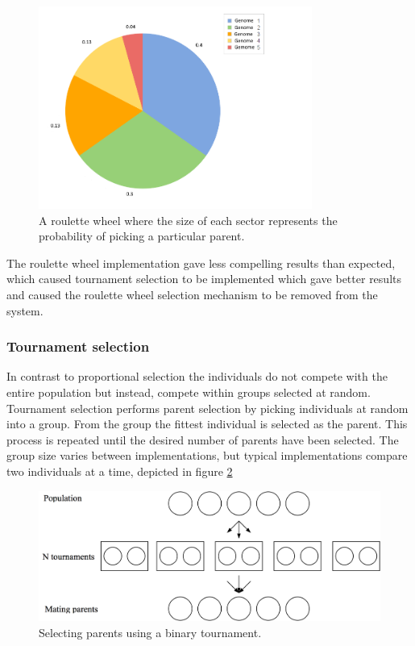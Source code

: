 \begin{figure}[H]
	\centering
	\includegraphics[width=0.80\textwidth, clip]{chapters/res/roulette.png}
	\caption{A roulette wheel where the size of each sector represents the probability of picking a particular parent.}
	\label{fig:roulette}
\end{figure}

The roulette wheel implementation gave less compelling results than expected, which caused tournament selection to be implemented which gave better results and caused the roulette wheel selection mechanism to be removed from the system.		
\subsubsection{Tournament selection}
In contrast to proportional selection the individuals do not compete with the entire population but instead, compete within groups selected at random.
Tournament selection performs parent selection by picking individuals at random into a group.
From the group the fittest individual is selected as the parent.
This process is repeated until the desired number of parents have been selected.
The group size varies between implementations, but typical implementations compare two\cite{goh_sexual_2003} individuals at a time, depicted in figure \ref{fig:tournament}

\begin{figure}[H]    
	\centering
	\includegraphics[width=\textwidth, clip]{chapters/res/Tournament.png}
	\caption{Selecting parents using a binary tournament.}
	\label{fig:tournament}
\end{figure}

